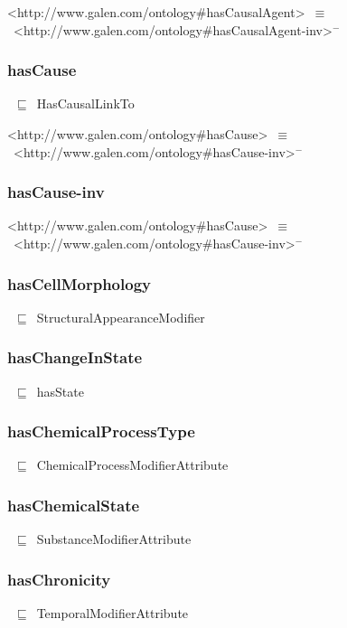 \documentclass{article}
\begin{document}
<http://www.galen.com/ontology#hasCausalAgent>~\ensuremath{\equiv}~<http://www.galen.com/ontology#hasCausalAgent-inv>\ensuremath{^-}

\subsubsection*{hasCause}

~\ensuremath{\sqsubseteq}~HasCausalLinkTo

<http://www.galen.com/ontology#hasCause>~\ensuremath{\equiv}~<http://www.galen.com/ontology#hasCause-inv>\ensuremath{^-}

\subsubsection*{hasCause-inv}

<http://www.galen.com/ontology#hasCause>~\ensuremath{\equiv}~<http://www.galen.com/ontology#hasCause-inv>\ensuremath{^-}

\subsubsection*{hasCellMorphology}

~\ensuremath{\sqsubseteq}~StructuralAppearanceModifier

\subsubsection*{hasChangeInState}

~\ensuremath{\sqsubseteq}~hasState

\subsubsection*{hasChemicalProcessType}

~\ensuremath{\sqsubseteq}~ChemicalProcessModifierAttribute

\subsubsection*{hasChemicalState}

~\ensuremath{\sqsubseteq}~SubstanceModifierAttribute

\subsubsection*{hasChronicity}

~\ensuremath{\sqsubseteq}~TemporalModifierAttribute
\end{document}
